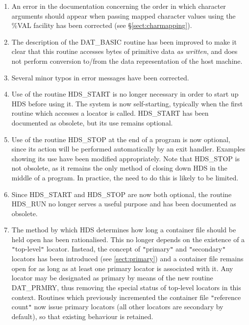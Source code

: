 \documentclass[11pt]{article}
\newcommand{\htmlref}[2]{#1}
\newcommand{\qt}[1]{``#1''}
\newcommand{\st}[1]{{\em{#1}}}
\renewcommand{\qt}[1]{{\tt{"}}#1{\tt{"}}}
\begin{document}
\begin{enumerate}
\item
An error in the documentation concerning the order in which character
arguments should appear when passing mapped character values using the
\%VAL facility has been corrected (see \S\ref{sect:charmapping}).

\item
The description of the \htmlref{DAT\_BASIC}{DAT_BASIC} routine has
been improved to make it clear that this routine accesses bytes of
primitive data \st{as written}, and does not perform conversion
to/from the data representation of the host machine.

\item
Several minor typos in error messages have been corrected.

\item
Use of the routine \htmlref{HDS\_START}{HDS_START} is no longer
necessary in order to start up HDS before using it. The system is now
self-starting, typically when the first routine which accesses a
\htmlref{locator}{sect:locators} is called. HDS\_START has been documented
as obsolete, but its use remains optional.

\item
Use of the routine \htmlref{HDS\_STOP}{HDS_STOP} at the end of a
program is now optional, since its action will be performed
automatically by an exit handler. Examples showing its use have been
modified appropriately. Note that HDS\_STOP is not obsolete, as it
remains the only method of closing down HDS in the middle of a
program. In practice, the need to do this is likely to be limited.

\item
Since \htmlref{HDS\_START}{HDS_START} and
\htmlref{HDS\_STOP}{HDS_STOP} are now both optional, the routine
\htmlref{HDS\_RUN}{HDS_RUN} no longer serves a useful purpose and has
been documented as obsolete.

\item
The method by which HDS determines how long a container file should be
held open has been rationalised. This no longer depends on the
existence of a \qt{top-level}
\htmlref{locator}{sect:locators}. Instead, the concept of \qt{primary}
and \qt{secondary} locators has been introduced (see
\ref{sect:primary}) and a container file remains open for as long as
at least one primary locator is associated with it.  Any locator may
be designated as primary by means of the new routine
\htmlref{DAT\_PRMRY}{DAT_PRMRY}, thus removing the special status of
top-level locators in this context. Routines which previously
incremented the container file \htmlref{\qt{reference
count}}{sect:refct} now issue primary locators (all other locators are
secondary by default), so that existing behaviour is retained.


\end{enumerate}
\end{document}
